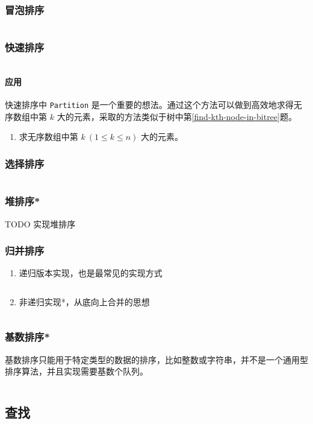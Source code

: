 \documentclass{ctexart}
\begin{document}
\subsubsection{冒泡排序}
\inputminted{c}{codes/bubble-sort.c}

\subsubsection{快速排序}
\inputminted{c}{codes/quick-sort.c}
\paragraph{应用}
快速排序中 \texttt{Partition} 是一个重要的想法。通过这个方法可以做到高效地求得无序数组中第 $k$ 大的元素，采取的方法类似于树中第\ref{find-kth-node-in-bitree}题。
\begin{enumerate}
    \item 求无序数组中第 $k\ (1 \le k \le n)$ 大的元素。
\end{enumerate}


\subsubsection{选择排序}
\inputminted{c}{codes/select-sort.c}

\subsubsection{堆排序*}
TODO 实现堆排序

\subsubsection{归并排序}
\begin{enumerate}
    \item 递归版本实现，也是最常见的实现方式
        \inputminted{c}{codes/merge-sort1.c}
    \item 非递归实现*，从底向上合并的思想
        \inputminted{c}{codes/merge-sort2.c}
\end{enumerate}

\subsubsection{基数排序*}
基数排序只能用于特定类型的数据的排序，比如整数或字符串，并不是一个通用型排序算法，并且实现需要基数个队列。
\inputminted{c}{codes/radix-sort.c}

\subsection{查找}
\end{document}
